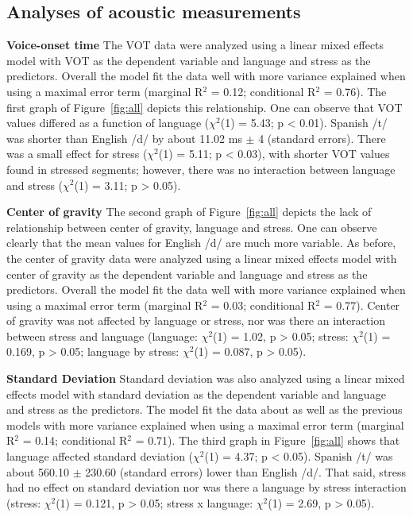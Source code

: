 \documentclass[a4paper,10pt,twocolumn]{article}\usepackage[]{graphicx}\usepackage[]{color}
\begin{document}
\subsection{Analyses of acoustic measurements} %
\label{sub:lmem}

	\textbf{Voice-onset time} %
	\label{par:vot}
	The VOT data were analyzed using a linear mixed effects model with VOT as the dependent variable and language and stress as the predictors. Overall the model fit the data well with more variance explained when using a maximal error term (marginal R$^2$ = 0.12; conditional R$^2$ = 0.76). The first graph of Figure~\ref{fig:all} depicts this relationship. One can observe that VOT values differed as a function of language ($\chi$$^2$(1) = 5.43; p < 0.01). Spanish /t/ was shorter than English /d/ by about 11.02 ms $\pm$ 4 (standard errors). There was a small effect for stress ($\chi$$^2$(1) = 5.11; p < 0.03), with shorter VOT values found in stressed segments; however, there was no interaction between language and stress ($\chi$$^2$(1) = 3.11; p > 0.05).
	
	\vspace{.025in}

	\noindent \textbf{Center of gravity} %
	\label{par:center_of_gravity}
	The second graph of Figure~\ref{fig:all} depicts the lack of relationship between center of gravity, language and stress. One can observe clearly that the mean values for English /d/ are much more variable. As before, the center of gravity data were analyzed using a linear mixed effects model with center of gravity as the dependent variable and language and stress as the predictors. Overall the model fit the data well with more variance explained when using a maximal error term (marginal R$^2$ = 0.03; conditional R$^2$ = 0.77). Center of gravity was not affected by language or stress, nor was there an interaction between stress and language (language: $\chi$$^2$(1) = 1.02, p > 0.05; stress: $\chi$$^2$(1) = 0.169, p > 0.05; language by stress: $\chi$$^2$(1) = 0.087, p > 0.05). 

	\vspace{.035in}

	\noindent \textbf{Standard Deviation} %
	\label{par:standard_deviation}
	Standard deviation was also analyzed using a linear mixed effects model with standard deviation as the dependent variable and language and stress as the predictors. The model fit the data about as well as the previous models with more variance explained when using a maximal error term (marginal R$^2$ = 0.14; conditional R$^2$ = 0.71). The third graph in Figure~\ref{fig:all} shows that language affected standard deviation ($\chi$$^2$(1) = 4.37; p < 0.05). Spanish /t/ was about 560.10 $\pm$ 230.60 (standard errors) lower than English /d/. That said, stress had no effect on standard deviation nor was there a language by stress interaction (stress: $\chi$$^2$(1) = 0.121, p > 0.05; stress x language: $\chi$$^2$(1) = 2.69, p > 0.05). 
\end{document}
